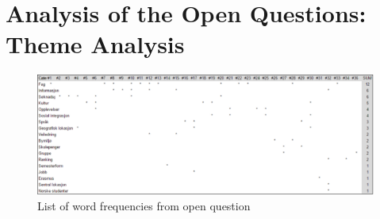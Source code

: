 \FloatBarrier
\section*{Analysis of the Open Questions: Theme Analysis}
\label{appendix:word_frequency}

\begin{figure}[h]
    \centering
    \includegraphics[width=1.0\textwidth]{fig/word_freq.png}
    \caption[]{List of word frequencies from open question}
    \label{fig:word_frequency}
\end{figure}

